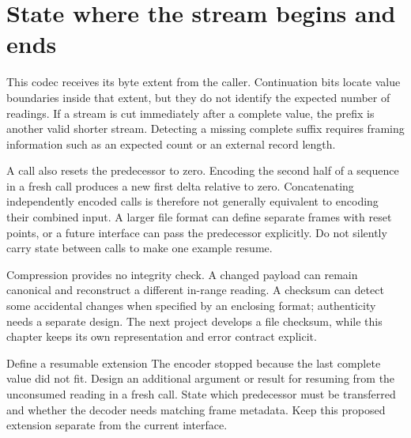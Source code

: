 \section{State where the stream begins and ends}
This codec receives its byte extent from the caller. Continuation bits locate value
boundaries inside that extent, but they do not identify the expected number of readings.
If a stream is cut immediately after a complete value, the prefix is another valid
shorter stream. Detecting a missing complete suffix requires framing information such
as an expected count or an external record length.

A call also resets the predecessor to zero. Encoding the second half of a sequence in
a fresh call produces a new first delta relative to zero. Concatenating independently
encoded calls is therefore not generally equivalent to encoding their combined input.
A larger file format can define separate frames with reset points, or a future interface
can pass the predecessor explicitly. Do not silently carry state between calls to make
one example resume.

Compression provides no integrity check. A changed payload can remain canonical and
reconstruct a different in-range reading. A checksum can detect some accidental changes
when specified by an enclosing format; authenticity needs a separate design. The next
project develops a file checksum, while this chapter keeps its own representation and
error contract explicit.

\begin{MARSExercise}{Define a resumable extension}
  The encoder stopped because the last complete value did not fit. Design an additional
  argument or result for resuming from the unconsumed reading in a fresh call. State
  which predecessor must be transferred and whether the decoder needs matching frame
  metadata. Keep this proposed extension separate from the current interface.
\end{MARSExercise}
